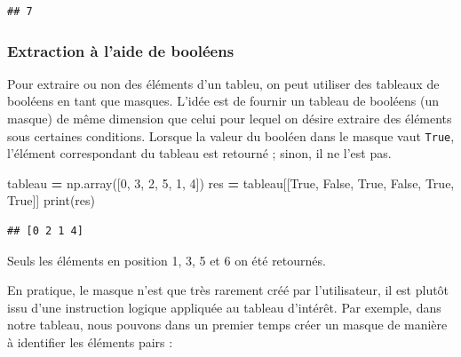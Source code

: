 \documentclass[12pt,]{book}
\newenvironment{Shaded}{\begin{snugshade}}{\end{snugshade}}
\newcommand{\DecValTok}[1]{\textcolor[rgb]{0.00,0.00,0.81}{#1}}
\newcommand{\VariableTok}[1]{\textcolor[rgb]{0.00,0.00,0.00}{#1}}
\newcommand{\OperatorTok}[1]{\textcolor[rgb]{0.81,0.36,0.00}{\textbf{#1}}}
\newcommand{\BuiltInTok}[1]{#1}
\newcommand{\NormalTok}[1]{#1}
\numberwithin{equation}{section}
\numberwithin{countremarque}{section}
\begin{document}
\begin{lstlisting}
## 7
\end{lstlisting}

\subsubsection{Extraction à l'aide de
booléens}\label{extraction-a-laide-de-booleens}

Pour extraire ou non des éléments d'un tableu, on peut utiliser des
tableaux de booléens en tant que masques. L'idée est de fournir un
tableau de booléens (un masque) de même dimension que celui pour lequel
on désire extraire des éléments sous certaines conditions. Lorsque la
valeur du booléen dans le masque vaut \texttt{True}, l'élément
correspondant du tableau est retourné ; sinon, il ne l'est pas.

\begin{Shaded}
\begin{Highlighting}[]
\NormalTok{tableau }\OperatorTok{=}\NormalTok{ np.array([}\DecValTok{0}\NormalTok{, }\DecValTok{3}\NormalTok{, }\DecValTok{2}\NormalTok{, }\DecValTok{5}\NormalTok{, }\DecValTok{1}\NormalTok{, }\DecValTok{4}\NormalTok{])}
\NormalTok{res }\OperatorTok{=}\NormalTok{ tableau[[}\VariableTok{True}\NormalTok{, }\VariableTok{False}\NormalTok{, }\VariableTok{True}\NormalTok{, }\VariableTok{False}\NormalTok{, }\VariableTok{True}\NormalTok{, }\VariableTok{True}\NormalTok{]]}
\BuiltInTok{print}\NormalTok{(res)}
\end{Highlighting}
\end{Shaded}

\begin{lstlisting}
## [0 2 1 4]
\end{lstlisting}

Seuls les éléments en position 1, 3, 5 et 6 on été retournés.

En pratique, le masque n'est que très rarement créé par l'utilisateur,
il est plutôt issu d'une instruction logique appliquée au tableau
d'intérêt. Par exemple, dans notre tableau, nous pouvons dans un premier
temps créer un masque de manière à identifier les éléments pairs :

\begin{Shaded}
\end{Shaded}
\end{document}
